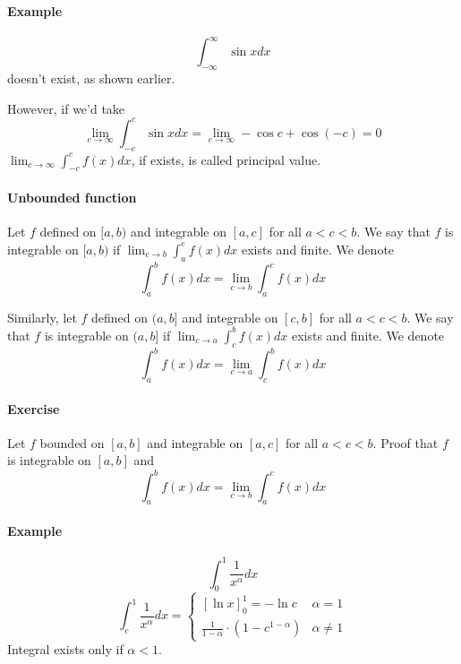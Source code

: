 \paragraph{Example}
$$\int_{-\infty}^{\infty}  \sin x dx$$
doesn't exist, as shown earlier.

However, if we'd take $$\lim_{c\to \infty} \int_{-c}^{c} \sin x dx = \lim_{c\to \infty} -\cos c + \cos (-c) = 0$$
$\lim_{c\to \infty} \int_{-c}^{c} f(x) dx$, if exists, is called principal value.
\paragraph{Unbounded function}
Let $f$ defined on $[a,b)$ and integrable on $[a,c]$ for all $a<c<b$. We say that $f$ is integrable on $[a,b)$ if $\lim_{c\to b} \int_a^c f(x) dx $ exists and finite. We denote
$$\int_a^b f(x) dx = \lim_{c\to b} \int_a^c f(x) dx$$

Similarly, let $f$ defined on $(a,b]$ and integrable on $[c,b]$ for all $a<c<b$. We say that $f$ is integrable on $(a,b]$ if $\lim_{c\to a} \int_c^b f(x) dx $ exists and finite. We denote
$$\int_a^b f(x) dx = \lim_{c\to a} \int_c^b f(x) dx$$
\paragraph{Exercise} Let $f$ bounded on $[a,b]$ and integrable on $[a,c]$ for all $a<c<b$. Proof that $f$ is integrable on $[a,b]$ and $$\int_a^b f(x) dx= \lim_{c\to b} \int_a^c f(x) dx$$
\paragraph{Example}
$$\int_0^1 \frac{1}{x^\alpha}dx$$
$$\int_c^1 \frac{1}{x^\alpha}dx = \begin{cases}
\left[\ln x\right]_0^1 = -\ln c & \alpha = 1 \\
\frac{1}{1-\alpha}\cdot (1-c^{1-\alpha})&\alpha \neq 1
\end{cases} $$
Integral exists only if $\alpha <1$.